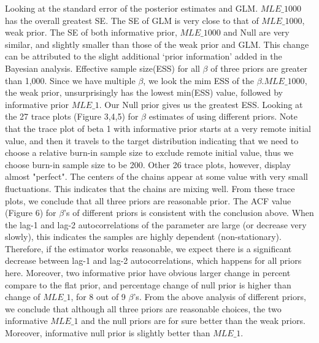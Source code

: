 \documentclass[paper=letterpaper,fontsize=12pt,twoside,american]{scrartcl}
\begin{document}
Looking at the standard error of the posterior estimates and GLM. $MLE\_1000$ has the overall greatest SE. The SE of GLM is very close to that of $MLE\_1000$, weak prior. The SE of both informative prior, $MLE\_1000$ and Null are very similar, and slightly smaller than those of the weak prior and GLM. This change can be attributed to the slight additional ‘prior information’ added in the Bayesian analysis. 
\newline
\newline
Effective sample size(ESS) for all $\beta$ of three priors are greater than 1,000. Since we have multiple $\beta$, we look the mim ESS of the $\beta$.$MLE\_1000$, the weak prior, unsurprisingly has the lowest min(ESS) value, followed by informative prior $MLE\_1$. Our Null prior gives us the greatest ESS.  
\newline
\newline
Looking at the 27 trace plots (Figure 3,4,5) for $\beta$ estimates of using different priors. Note that the trace plot of beta 1 with informative prior starts at a very remote initial value, and then it travels to the target distribution indicating that we need to choose a relative burn-in sample size to exclude remote initial value, thus we choose burn-in sample size to be 200. Other 26 trace plots, however, display almost "perfect". The centers of the chains appear at some value with very small fluctuations. This indicates that the chains are mixing well. From these trace plots, we conclude that all three priors are reasonable prior.
\newline
\newline
The ACF value (Figure 6) for $\beta$'s of different priors is consistent with the conclusion above. When the lag-1 and lag-2 autocorrelations of the parameter are large (or decrease very slowly), this indicates the samples are highly dependent (non-stationary). Therefore, if the estimator works reasonable, we expect there is a significant decrease between lag-1 and lag-2 autocorrelations, which happens for all priors here. Moreover, two informative prior have obvious larger change in percent compare to the flat prior, and percentage change of null prior is higher than change of $MLE\_1$, for 8 out of 9 $\beta$'s.
\newline
\newline
From the above analysis of different priors, we conclude that although all three priors are reasonable choices, the two informative $MLE\_1$ and the null priors are for sure better than the weak priors. Moreover, informative null prior is slightly better than $MLE\_1$. 
\end{document}
